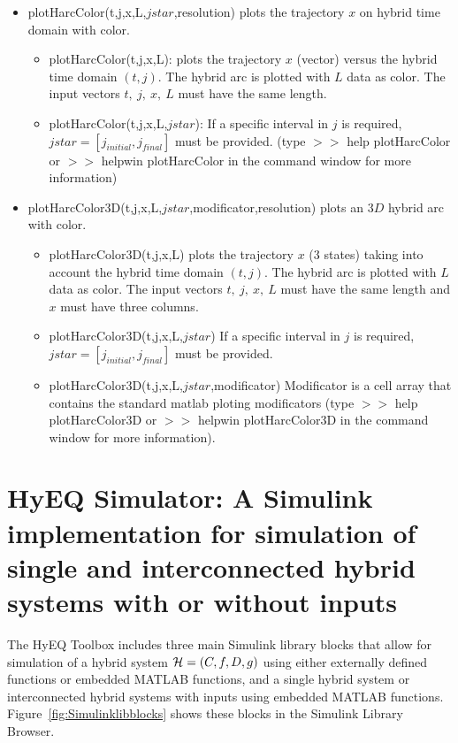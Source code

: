 \documentclass{article}
\begin{document}
\begin{itemize}
\item plotHarcColor(t,j,x,L,$jstar$,resolution) plots the trajectory $x$ on hybrid time domain with color.
\begin{itemize}
\item plotHarcColor(t,j,x,L): plots the trajectory $x$ (vector) versus the hybrid time domain $(t,j)$. The hybrid arc is plotted with $L$ data as color. The input vectors $t,\ j,\ x,\ L$ must have the same length. 
\item      plotHarcColor(t,j,x,L,$jstar$): If a specific interval in $j$ is required, $jstar = [j_{initial},
 j_{final}]$ must be provided. (type $>>$ help plotHarcColor or $>>$ helpwin plotHarcColor in the command window for more information)
\end{itemize}

\item plotHarcColor3D(t,j,x,L,$jstar$,modificator,resolution) plots an $3D$ hybrid arc with color.
\begin{itemize}
\item plotHarcColor3D(t,j,x,L) plots the trajectory $x$ (3 states) taking into account the hybrid time domain $(t,j)$. The hybrid arc is plotted with $L$ data as color. The input vectors $t,\ j,\ x,\ L$ must have the same length and $x$ must have three columns.
\item plotHarcColor3D(t,j,x,L,$jstar$) If a specific interval in $j$ is required, $jstar = [j_{initial},
 j_{final}]$ must be provided.
 \item plotHarcColor3D(t,j,x,L,$jstar$,modificator) Modificator is a cell array that contains the standard matlab ploting modificators (type $>>$ help plotHarcColor3D or $>>$ helpwin plotHarcColor3D in the command window for more information).
\end{itemize}
\end{itemize}

\section{HyEQ Simulator: A Simulink implementation for simulation of single and interconnected hybrid systems with or without inputs}
\label{sec:HyEQsimulator}

The HyEQ Toolbox includes three main Simulink library blocks that allow for simulation of a hybrid system $\mathcal{H} =(C,f,D,g)$ using either externally defined functions or embedded MATLAB functions, and a single hybrid system or interconnected hybrid systems with inputs using embedded MATLAB functions. Figure~\ref{fig:Simulinklibblocks} shows these blocks in the Simulink Library Browser.
\end{document}
